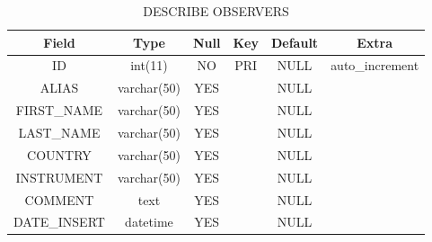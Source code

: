 \documentclass[12pt]{article}
\begin{document}
\begin{table}[h!]
    \centering
    \caption{DESCRIBE OBSERVERS}
    \begin{tabular}{c|c|c|c|c|c}%
        \textbf{Field} & \textbf{Type} & \textbf{Null} & \textbf{Key} & \textbf{Default} & \textbf{Extra}  \\
        \hline
        ID & int(11) & NO & PRI & NULL & auto\_increment \\
        
        ALIAS & varchar(50) & YES && NULL & \\
        
        FIRST\_NAME & varchar(50) & YES && NULL &  \\
        
        LAST\_NAME & varchar(50) & YES && NULL &  \\
        
        COUNTRY & varchar(50) & YES && NULL &  \\
        
        INSTRUMENT & varchar(50) & YES && NULL & \\
        
        COMMENT & text & YES && NULL &  \\
        
        DATE\_INSERT & datetime & YES && NULL &  \\
        
    \end{tabular}
    \label{tab:data-og}
\end{table}
\end{document}

